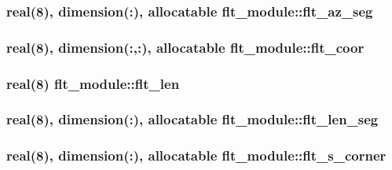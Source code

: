 \subsubsection[{flt\+\_\+az\+\_\+seg}]{\setlength{\rightskip}{0pt plus 5cm}real(8), dimension(\+:), allocatable flt\+\_\+module\+::flt\+\_\+az\+\_\+seg}\label{namespaceflt__module_afe7ee1528f7162ad84a3517be2962885}
\hypertarget{namespaceflt__module_a5f040c388185e1ef250084d5c59d41e9}{}
\subsubsection[{flt\+\_\+coor}]{\setlength{\rightskip}{0pt plus 5cm}real(8), dimension(\+:,\+:), allocatable flt\+\_\+module\+::flt\+\_\+coor}\label{namespaceflt__module_a5f040c388185e1ef250084d5c59d41e9}
\hypertarget{namespaceflt__module_a4bc1d05951c8d1ad1263099b2168fc52}{}
\subsubsection[{flt\+\_\+len}]{\setlength{\rightskip}{0pt plus 5cm}real(8) flt\+\_\+module\+::flt\+\_\+len}\label{namespaceflt__module_a4bc1d05951c8d1ad1263099b2168fc52}
\hypertarget{namespaceflt__module_aca5726712ea516198b181e7cb2f58a79}{}
\subsubsection[{flt\+\_\+len\+\_\+seg}]{\setlength{\rightskip}{0pt plus 5cm}real(8), dimension(\+:), allocatable flt\+\_\+module\+::flt\+\_\+len\+\_\+seg}\label{namespaceflt__module_aca5726712ea516198b181e7cb2f58a79}
\hypertarget{namespaceflt__module_ade0f97d7261ffc38567aa16de68c1583}{}
\subsubsection[{flt\+\_\+s\+\_\+corner}]{\setlength{\rightskip}{0pt plus 5cm}real(8), dimension(\+:), allocatable flt\+\_\+module\+::flt\+\_\+s\+\_\+corner}\label{namespaceflt__module_ade0f97d7261ffc38567aa16de68c1583}
\hypertarget{namespaceflt__module_a5f628ae600d8550ab693d874d7a26bb0}{}
